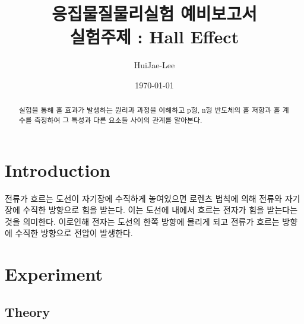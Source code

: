 \documentclass[aps,reprint,superscriptaddress,10pt]{revtex4-2}
\begin{document}
\title{응집물질물리실험 예비보고서 \\
\small 실험주제 : Hall Effect}

\author{HuiJae-Lee}


\date{\today}


\begin{abstract}
실험을 통해 홀 효과가 발생하는 원리과 과정을 이해하고 p형, n형 반도체의 홀 저항과 홀 계수를 
측정하여 그 특성과 다른 요소들 사이의 관계를 알아본다.
\end{abstract}
 
 \maketitle
 
\section[Introduction]{Introduction}
전류가 흐르는 도선이 자기장에 수직하게 놓여있으면 로렌츠 법칙에 의해 전류와 자기장에 수직한 방향으로
힘을 받는다. 이는 도선에 내에서 흐르는 전자가 힘을 받는다는 것을 의미한다. 이로인해
전자는 도선의 한쪽 방향에 몰리게 되고 전류가 흐르는 방향에 수직한 방향으로 전압이 발생한다.

\section{Experiment}

\subsection{Theory}
\end{document}
